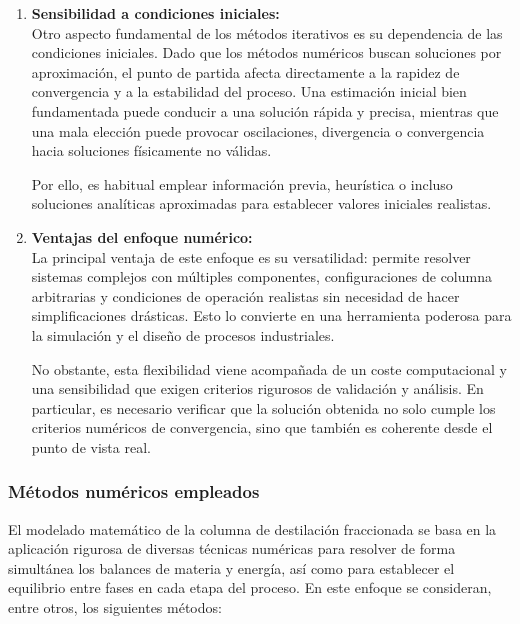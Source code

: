 \begin{enumerate}
      \item \textbf{Sensibilidad a condiciones iniciales:}\\
            Otro aspecto fundamental de los métodos iterativos es su dependencia de las condiciones iniciales. Dado que los métodos numéricos buscan soluciones por aproximación, el punto de partida afecta directamente a la rapidez de convergencia y a la estabilidad del proceso. Una estimación inicial bien fundamentada puede conducir a una solución rápida y precisa, mientras que una mala elección puede provocar oscilaciones, divergencia o convergencia hacia soluciones físicamente no válidas.

            Por ello, es habitual emplear información previa, heurística o incluso soluciones analíticas aproximadas para establecer valores iniciales realistas.

      \item \textbf{Ventajas del enfoque numérico:}\\
            La principal ventaja de este enfoque es su versatilidad: permite resolver sistemas complejos con múltiples componentes, configuraciones de columna arbitrarias y condiciones de operación realistas sin necesidad de hacer simplificaciones drásticas. Esto lo convierte en una herramienta poderosa para la simulación y el diseño de procesos industriales.

            No obstante, esta flexibilidad viene acompañada de un coste computacional y una sensibilidad que exigen criterios rigurosos de validación y análisis. En particular, es necesario verificar que la solución obtenida no solo cumple los criterios numéricos de convergencia, sino que también es coherente desde el punto de vista real.
\end{enumerate}

\subsubsection{Métodos numéricos empleados}
El modelado matemático de la columna de destilación fraccionada se basa en la aplicación rigurosa de diversas técnicas numéricas para resolver de forma simultánea los balances de materia y energía, así como para establecer el equilibrio entre fases en cada etapa del proceso. En este enfoque se consideran, entre otros, los siguientes métodos:

